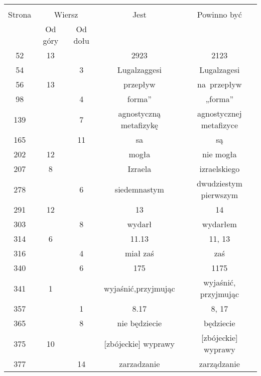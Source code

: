 \documentclass[a4paper,11pt]{article}
\begin{document}
\begin{center}

  \begin{tabular}{|c|c|c|c|c|}
    \hline
    & \multicolumn{2}{c|}{} & & \\
    Strona & \multicolumn{2}{c|}{Wiersz} & Jest
                              & Powinno być \\ \cline{2-3}
    & Od góry & Od dołu & & \\
    \hline
    52  & 13 & & 2923 & 2123 \\
    54  & &  3 & Lugalzaggesi & Lugalzagesi \\
    56  & 13 & & przepływ & na~przepływ \\
    98  & &  4 & forma” & „forma” \\
    139 & &  7 & agnostyczną metafizykę & agnostycznej metafizyce \\
    165 & & 11 & sa & są \\
    202 & 12 & & mogła & nie mogła \\
    207 &  8 & & Izraela & izraelskiego \\
    278 & &  6 & siedemnastym & dwudziestym pierwszym \\
    291 & 12 & & 13 & 14 \\
    303 & &  8 & wydarł & wydarłem \\
    314 &  6 & & 11.13 & 11, 13 \\
    316 & &  4 & miał zaś & zaś \\
    340 & &  6 & 175 & 1175 \\
    341 &  1 & & wyjaśnić,przyjmując & wyjaśnić, przyjmując \\
    357 & &  1 & 8.17 & 8, 17 \\
    365 & &  8 & nie będziecie & będziecie \\
    375 & 10 & & [zbójeckie]{ } wyprawy & [zbójeckie] wyprawy \\
    377 & & 14 & zarzadzanie & zarządzanie \\
    \hline
  \end{tabular}

\end{center}

\vspace{\spaceTwo}
\end{document}
